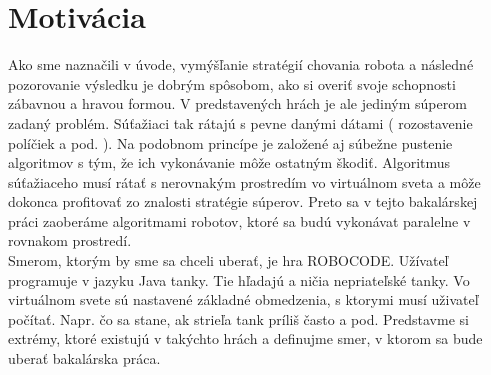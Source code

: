 \section{Motivácia}
Ako sme naznačili v úvode, vymýšľanie stratégií chovania robota a následné pozorovanie výsledku je dobrým spôsobom, ako si overiť svoje schopnosti zábavnou a hravou formou. V predstavených hrách je ale jediným súperom zadaný problém. Súťažiaci tak rátajú s pevne danými dátami ( rozostavenie políčiek a pod. ). Na podobnom princípe je založené aj súbežne pustenie algoritmov s tým, že ich vykonávanie môže ostatným škodiť. Algoritmus súťažiaceho musí rátať s nerovnakým prostredím vo virtuálnom sveta a môže dokonca profitovať zo znalosti stratégie súperov. Preto sa v tejto bakalárskej práci zaoberáme algoritmami robotov, ktoré sa budú vykonávat paralelne v rovnakom prostredí.\\
Smerom, ktorým by sme sa chceli uberať, je hra ROBOCODE\cite{robocode}. Užívateľ programuje v jazyku Java tanky. Tie hľadajú a ničia nepriateľské tanky.  Vo virtuálnom svete sú nastavené základné obmedzenia, s ktorymi musí uživateľ počítať. Napr. čo sa stane, ak strieľa tank príliš často a pod. Predstavme si extrémy, ktoré existujú v takýchto hrách a definujme smer, v ktorom sa bude uberať bakalárska práca.
